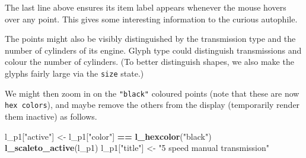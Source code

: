 \documentclass[]{article}
\newenvironment{Shaded}{\begin{snugshade}}{\end{snugshade}}
\newcommand{\KeywordTok}[1]{\textcolor[rgb]{0.13,0.29,0.53}{\textbf{#1}}}
\newcommand{\DecValTok}[1]{\textcolor[rgb]{0.00,0.00,0.81}{#1}}
\newcommand{\StringTok}[1]{\textcolor[rgb]{0.31,0.60,0.02}{#1}}
\newcommand{\ControlFlowTok}[1]{\textcolor[rgb]{0.13,0.29,0.53}{\textbf{#1}}}
\newcommand{\OperatorTok}[1]{\textcolor[rgb]{0.81,0.36,0.00}{\textbf{#1}}}
\newcommand{\NormalTok}[1]{#1}
\begin{document}
The last line above ensures its item label appears whenever the mouse
hovers over any point. This gives some interesting information to the
curious autophile.

The points might also be visibly distinguished by the transmission type
and the number of cylinders of its engine. Glyph type could distinguish
transmissions and colour the number of cylinders. (To better distinguish
shapes, we also make the glyphs fairly large via the \texttt{size}
state.)

\begin{Shaded}
\end{Shaded}

We might then zoom in on the \texttt{"black"} coloured points (note that
these are now \texttt{hex\ colors}), and maybe remove the others from
the display (temporarily render them inactive) as follows.

\begin{Shaded}
\begin{Highlighting}[]
\NormalTok{l_p1[}\StringTok{"active"}\NormalTok{] <-}\StringTok{ }\NormalTok{l_p1[}\StringTok{"color"}\NormalTok{] }\OperatorTok{==}\StringTok{ }\KeywordTok{l_hexcolor}\NormalTok{(}\StringTok{"black"}\NormalTok{)}
\KeywordTok{l_scaleto_active}\NormalTok{(l_p1)}
\NormalTok{l_p1[}\StringTok{"title"}\NormalTok{] <-}\StringTok{ "5 speed manual transmission"}
\end{Highlighting}
\end{Shaded}
\end{document}
